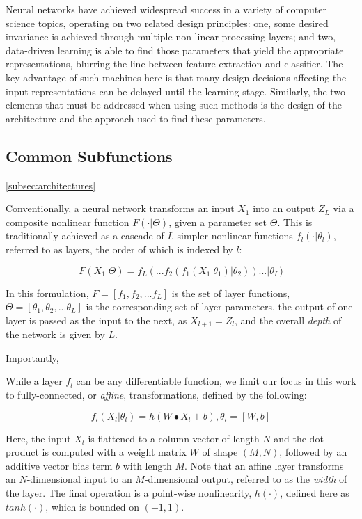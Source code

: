 Neural networks have achieved widespread success in a variety of computer science topics, operating on two related design principles:
one, some desired invariance is achieved through multiple non-linear processing layers;
and two, data-driven learning is able to find those parameters that yield the appropriate representations, blurring the line between feature extraction and classifier.
The key advantage of such machines here is that many design decisions affecting the input representations can be delayed until the learning stage.
Similarly, the two elements that must be addressed when using such methods is the design of the architecture and the approach used to find these parameters.


\subsection{Common Subfunctions}
\ref{subsec:architectures}

Conventionally, a neural network transforms an input $X_{1}$ into an output $Z_{L}$ via a composite nonlinear function $F(\cdot \vert \Theta)$, given a parameter set $\Theta$.
This is traditionally achieved as a cascade of $L$ simpler nonlinear functions $f_l(\cdot \vert \theta_l)$, referred to as layers, the order of which is indexed by $l$:

\begin{equation}
\label{eq:layers}
F(X_{1} \vert \Theta) = f_{L}(  ... f_2(f_1(X_{1} \vert \theta_1) \vert \theta_2) ) ... \vert \theta_{L})
\end{equation}

\noindent In this formulation, $F = [f_1, f_2, ... f_{L} ]$ is the set of layer functions, $\Theta = [\theta_1, \theta_2, ... \theta_{L} ]$ is the corresponding set of layer parameters, the output of one layer is passed as the input to the next, as $X_{l+1} = Z_{l}$, and the overall \emph{depth} of the network is given by $L$.

Importantly,

While a layer $f_l$ can be any differentiable function, we limit our focus in this work to fully-connected, or \emph{affine}, transformations, defined by the following:

\begin{equation}
\label{eq:fclayer}
f_l(X_l \vert \theta_l) = h( W \bullet X_{l} + b), \theta_l = [W, b]
\end{equation}

\noindent Here, the input $X_l$ is flattened to a column vector of length $N$ and the dot-product is computed with a weight matrix $W$ of shape $(M, N)$, followed by an additive vector bias term $b$ with length $M$.
Note that an affine layer transforms an $N$-dimensional input to an $M$-dimensional output, referred to as the \emph{width} of the layer.
The final operation is a point-wise nonlinearity, $h(\cdot)$, defined here as $tanh(\cdot)$, which is bounded on $(-1, 1)$.

